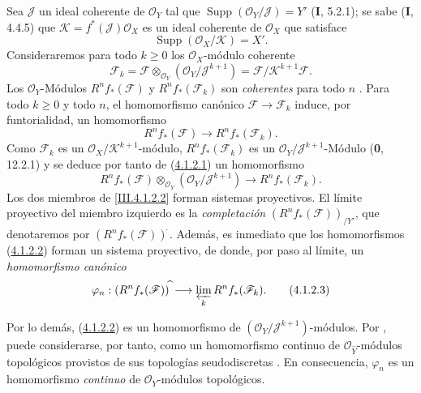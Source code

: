 \begin{env}[4.1.2]
\label{III.4.1.2}
\label{III.4.1.2-fr}
Sea $\mathcal J$ un ideal coherente de $\mathcal O_Y$ tal que
$\operatorname{Supp}(\mathcal O_Y/\mathcal J)=Y'$ (\textbf{I}, 5.2.1); se sabe (\textbf{I}, 4.4.5) que $\mathcal K=f^*(\mathcal J)\mathcal O_X$
es un ideal coherente de $\mathcal O_X$ que satisface
\[
\operatorname{Supp}(\mathcal O_X/\mathcal K)=X'.
\]
Consideraremos para todo $k\geq0$ los $\mathcal O_X$-módulo coherente
\[
\mathcal F_k
=\mathcal F\otimes_{\mathcal O_Y}(\mathcal O_Y/\mathcal J^{k+1})
=\mathcal F/\mathcal K^{k+1}\mathcal F.
\]
Los $\mathcal O_Y$-Módulos $R^nf_*(\mathcal F)$ y
$R^nf_*(\mathcal F_k)$ son \emph{coherentes} para todo $n$ .
Para todo $k\geq0$ y todo $n$, el homomorfismo canónico
$\mathcal F\to\mathcal F_k$ induce, por funtorialidad, un homomorfismo
\[
R^nf_*(\mathcal F)\longrightarrow R^nf_*(\mathcal F_k).
\tag{4.1.2.1}\label{III.4.1.2.1-fr}
\]
Como $\mathcal F_k$ es un $\mathcal O_X/\mathcal K^{k+1}$-módulo,
$R^nf_*(\mathcal F_k)$ es un
$\mathcal O_Y/\mathcal J^{k+1}$-Módulo (\textbf{0}, 12.2.1) y se deduce por tanto de (\hyperref[III.4.1.2.1-fr]{4.1.2.1}) un homomorfismo \[
R^nf_*(\mathcal F)\otimes_{\mathcal O_Y}
(\mathcal O_Y/\mathcal J^{k+1})
\longrightarrow R^nf_*(\mathcal F_k).
\tag{4.1.2.2}\label{III.4.1.2.2-fr}
\]
Los dos miembros de \eqref{III.4.1.2.2} forman sistemas proyectivos.
El límite proyectivo del miembro izquierdo es la \emph{completación}
$(R^nf_*(\mathcal F))_{/Y'}$, que denotaremos por
$(R^nf_*(\mathcal F))^{\widehat{\,}}$. Además, es inmediato que los
homomorfismos (\hyperref[III.4.1.2.2-fr]{4.1.2.2}) forman un sistema
proyectivo, de donde, por paso al límite, un \emph{homomorfismo canónico}
\[
\varphi_n:(R^nf_*(\mathcal F))^{\widehat{\,}}
\longrightarrow\varprojlim_kR^nf_*(\mathcal F_k).
\tag{4.1.2.3}\label{III.4.1.2.3-fr}
\]

Por lo demás, (\hyperref[III.4.1.2.2-fr]{4.1.2.2}) es un homomorfismo de
$(\mathcal O_Y/\mathcal J^{k+1})$-módulos.
Por , puede considerarse, por tanto, como un
homomorfismo continuo de $\mathcal O_{\widehat Y}$-módulos topológicos
provistos de sus topologías seudodiscretas .
En consecuencia, $\varphi_n$ es un homomorfismo \emph{continuo} de
$\mathcal O_Y$-módulos topológicos.
\end{env}


